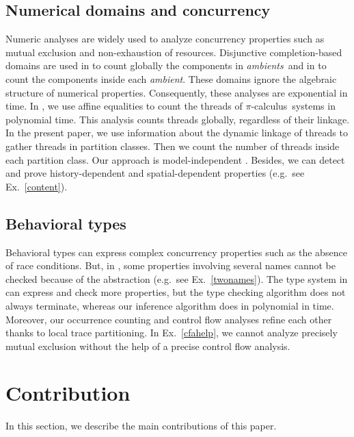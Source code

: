 \documentclass{article}
\newcommand{\picalcul}{$\pi$-calculus}
\newcommand{\ambient}{\emph{ambient}}
\newcommand{\ambients}{\emph{ambients}}
\begin{document}
\subsection{Numerical domains and concurrency}
Numeric analyses are widely used to analyze concurrency properties such as mutual exclusion and non-exhaustion of resources.
Disjunctive completion-based domains are used  in \cite{HJNN99ai} to count globally the components in \ambients\ and  in \cite{NiNi00popl,gori:aplas} to count the components inside each \ambient. 
These domains ignore the algebraic structure of numerical properties. 
Consequently, these analyses are exponential in time.
In \cite{feret:jlap,feret:getco2000}, we use affine equalities to count the threads of \picalcul\ systems  in polynomial time.
This analysis counts threads globally, regardless of their linkage. 
In the present paper, we  use information about the dynamic linkage of threads to gather threads in partition classes. Then we count the number of threads inside each partition class. Our approach is model-independent \cite{feret:thesis}.
Besides, we can detect and prove history-dependent and spatial-dependent properties (e.g.~see Ex.~\ref{content}).
\subsection{Behavioral types}
Behavioral types can express complex concurrency properties such as the absence of race conditions. 
But, in \cite{igarashi.kobayashi:generic-type}, some properties involving several names  cannot be checked because of the abstraction (e.g.~see Ex.~\ref{twonames}). 
The type system in \cite{rajamani.rehof:behavioral-module,rehofpopl02} can express and check more properties, but the type checking algorithm does not always terminate, whereas our inference algorithm  does in polynomial in time.
Moreover, 
our occurrence counting and control flow analyses refine each other thanks to local trace partitioning. 
In Ex.~\ref{cfahelp}, we cannot analyze precisely mutual exclusion without the help of a precise control flow analysis.

\section{Contribution}
\label{contribution}
In this section, we describe the main contributions of this paper. 
\end{document}
